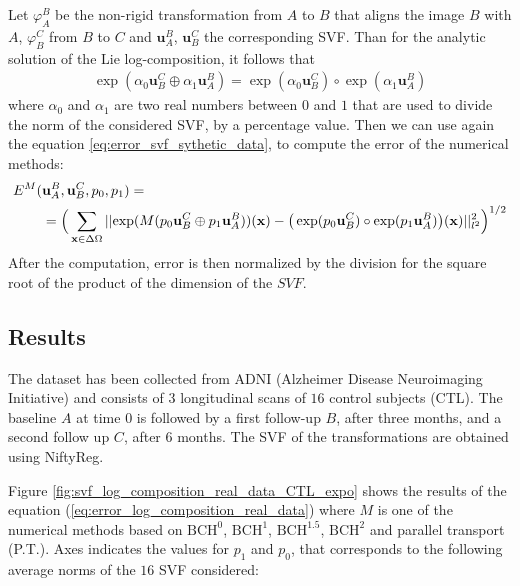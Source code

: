 Let $\varphi_{A}^{B}$ be the non-rigid transformation from $A$ to $B$ that aligns the image $B$ with $A$, $\varphi_{B}^{C}$ from $B$ to $C$ and $\mathbf{u}_{A}^{B}$, $\mathbf{u}_{B}^{C}$ the corresponding SVF.
Than for the analytic solution of the Lie log-composition, it follows that
\begin{align*}
	\exp(\alpha_0\mathbf{u}_{B}^{C} \oplus \alpha_1\mathbf{u}_{A}^{B})
	=
	\exp(\alpha_0\mathbf{u}_{B}^{C}) \circ\exp(\alpha_1\mathbf{u}_{A}^{B})
\end{align*} 
where $\alpha_0$ and $\alpha_1$ are two real numbers between $0$ and $1$ that are used to divide the norm of the considered SVF, by a percentage value.
Then we can use again the equation \ref{eq:error_svf_sythetic_data}, to compute the error of the numerical methods:
\begin{equation}
\begin{aligned}\label{eq:error_log_composition_real_data}
E^{M}(&\mathbf{u}_{A}^{B}, \mathbf{u}_{B}^{C}, p_0, p_1) = \\
&= 
\Big( \sum_{\mathbf{x} \in \Delta\Omega} 
\vert\lvert 
	\exp(M(p_0\mathbf{u}_{B}^{C} \oplus p_1\mathbf{u}_{A}^{B}))(\mathbf{x}) 
	-
	\big(\exp(p_0\mathbf{u}_{B}^{C}) \circ\exp(p_1\mathbf{u}_{A}^{B})\big)(\mathbf{x}) 
 \rvert\vert_{l^2}^{2}  \Big)^{1/2}
\end{aligned}
\end{equation}
After the computation, error is then normalized by the division for the square root of the product of the dimension of the $SVF$.

\subsection{Results}
%
The dataset has been collected from ADNI (Alzheimer Disease Neuroimaging Initiative) \cite{jack2008alzheimer} and consists of $3$ longitudinal scans of $16$ control subjects (CTL).
The baseline $A$ at time $0$ is followed by a first follow-up $B$, after three months, and a second follow up $C$, after $6$ months. The SVF of the transformations are obtained using NiftyReg. 

Figure \ref{fig:svf_log_composition_real_data_CTL_expo} shows the results of the equation (\ref{eq:error_log_composition_real_data}) where $M$ is one of the numerical methods based on $\text{BCH}^0$, $\text{BCH}^1$, $\text{BCH}^{1.5}$, $\text{BCH}^2$ and parallel transport (P.T.).
Axes indicates the values for $p_1$ and $p_0$, that corresponds to the following average norms of the $16$ SVF considered:

